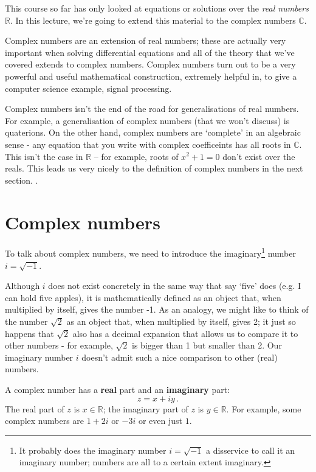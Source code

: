 \documentclass[12pt]{article}
\begin{document}
This course so far has only looked at equations or solutions over the \emph{real numbers} $\mathbb{R}$. In this lecture, we're going to extend this material to the complex numbers $\mathbb{C}$.

Complex numbers are an extension of real numbers; these are actually very important when solving differential equations and all of the theory that we've covered extends to complex numbers. Complex numbers turn out to be a
very powerful and useful mathematical construction, extremely helpful
in, to give a computer science example, signal processing.

Complex numbers isn't the end of the road for generalisations of real numbers. For example, a generalisation of complex numbers (that we won't discuss) is quaterions. On the other hand, complex numbers are `complete' in an algebraic sense - any equation that you write with complex coefficeints has all roots in $\mathbb{C}$. This isn't the case in $\mathbb{R}$ -- for example, roots of $x^2 + 1= 0$ don't exist over the reals. This leads us very nicely to the definition of complex numbers in the next section. .

\section*{Complex numbers}
To talk about complex numbers, we need to introduce the imaginary\footnote{It probably does the imaginary number $i=\sqrt{-1}$ a disservice to
call it an imaginary number; numbers are all to a certain extent
imaginary.} number $i=\sqrt{-1}$. 

Although $i$ does not exist concretely in the same way that say `five' does (e.g. I can hold five apples), it is mathematically defined as an object that, when multiplied by itself, gives the number -1. As an analogy, we might like to think of the number $\sqrt{2}$ as an object that, when multiplied by itself, gives 2; it just so happens that $\sqrt{2}$ also has a decimal expansion that allows us to compare it to other numbers - for example, $\sqrt{2}$ is bigger than 1 but smaller than 2. Our imaginary number $i$ doesn't admit such a nice comparison to other (real) numbers.

A complex number has a \textbf{real} part and an \textbf{imaginary} part:
\begin{equation}
  z=x+iy\,.
\end{equation}
The real part of $z$ is $x\in \mathbb{R}$; the imaginary part of $z$ is $y\in \mathbb{R}$.
For example, some complex numbers are $1+2i$ or $-3i$ or even just $1$.
\end{document}
